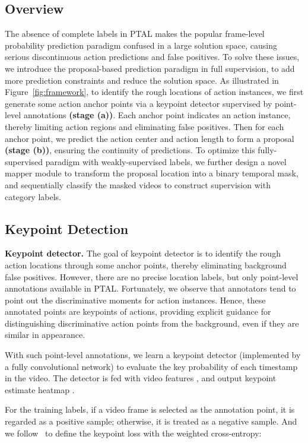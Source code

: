 \documentclass[final]{cvpr}
\begin{document}
\subsection{Overview}
The absence of complete labels in PTAL makes the popular frame-level probability prediction paradigm confused in a large solution space, causing serious discontinuous action predictions and false positives.
To solve these issues, we introduce the proposal-based prediction paradigm in full supervision, to add more prediction constraints and reduce the solution space.
As illustrated in Figure~\ref{fig:framework}, to identify the rough locations of action instances, we first generate some action anchor points via a keypoint detector supervised by point-level annotations \textbf{(stage (a))}. Each anchor point indicates an action instance, thereby limiting action regions and eliminating false positives. Then for each anchor point, we predict the action center and action length to form a proposal \textbf{(stage (b))}, ensuring the continuity of predictions.
To optimize this fully-supervised paradigm with weakly-supervised labels, we further design a novel mapper module to transform the proposal location into a binary temporal mask, and sequentially classify the masked videos to construct supervision with category labels.




\subsection{Keypoint Detection}
\textbf{Keypoint detector.}
The goal of keypoint detector is to identify the rough action locations through some anchor points, thereby eliminating background false positives. However, there are no precise location labels, but only point-level annotations available in PTAL. Fortunately, we observe that annotators tend to point out the discriminative moments for action instances. Hence, these annotated points are keypoints of actions, providing explicit guidance for distinguishing discriminative action points from the background, even if they are similar in appearance.




With such point-level annotations, we learn a keypoint detector (implemented by a fully convolutional network) to evaluate the key probability of each timestamp in the video. The detector is fed with video features , and output keypoint estimate heatmap .


For the training labels, if a video frame is selected as the annotation point, it is regarded as a positive sample; otherwise, it is treated as a negative sample.
And we follow~\cite{lin2018bsn,zhao2020bottom,lin2019bmn} to define the keypoint loss with the weighted cross-entropy:
\end{document}
